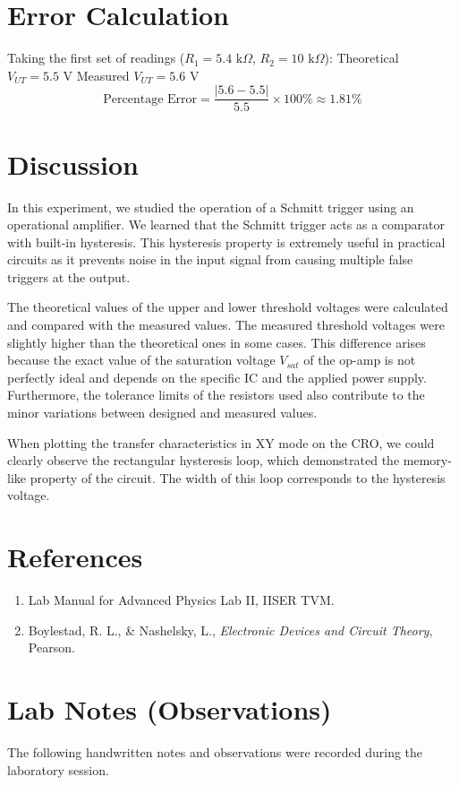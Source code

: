 \documentclass[12pt,a4paper]{article}
\begin{document}
\section{Error Calculation}
Taking the first set of readings ($R_1 = 5.4\text{ k}\Omega$, $R_2 = 10\text{ k}\Omega$):
Theoretical $V_{UT} = 5.5\text{ V}$
Measured $V_{UT} = 5.6\text{ V}$
$$ \text{Percentage Error} = \frac{|5.6 - 5.5|}{5.5} \times 100\% \approx 1.81\% $$

\section{Discussion}
In this experiment, we studied the operation of a Schmitt trigger using an operational amplifier. We learned that the Schmitt trigger acts as a comparator with built-in hysteresis. This hysteresis property is extremely useful in practical circuits as it prevents noise in the input signal from causing multiple false triggers at the output. 

The theoretical values of the upper and lower threshold voltages were calculated and compared with the measured values. The measured threshold voltages were slightly higher than the theoretical ones in some cases. This difference arises because the exact value of the saturation voltage $V_{sat}$ of the op-amp is not perfectly ideal and depends on the specific IC and the applied power supply. Furthermore, the tolerance limits of the resistors used also contribute to the minor variations between designed and measured values. 

When plotting the transfer characteristics in XY mode on the CRO, we could clearly observe the rectangular hysteresis loop, which demonstrated the memory-like property of the circuit. The width of this loop corresponds to the hysteresis voltage.

\section{References}
\begin{enumerate}
    \item Lab Manual for Advanced Physics Lab II, IISER TVM.
    \item Boylestad, R. L., \& Nashelsky, L., \textit{Electronic Devices and Circuit Theory}, Pearson.
\end{enumerate}

\section{Lab Notes (Observations)}
The following handwritten notes and observations were recorded during the laboratory session.
\end{document}
